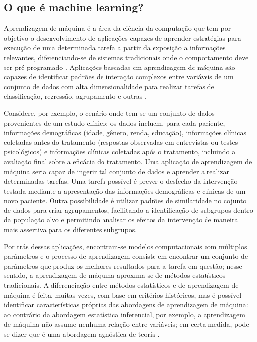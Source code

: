 \subsection{O que é machine learning?}

Aprendizagem de máquina é a área da ciência da computação que tem por objetivo o desenvolvimento
de aplicações capazes de aprender estratégias para execução de uma determinada tarefa a partir da
exposição a informações relevantes, diferenciando-se de sistemas tradicionais onde o comportamento
deve ser pré-programado \cite{Bi2019}. Aplicações baseadas em aprendizagem de máquina são capazes de
identificar padrões de interação complexos entre variáveis de um conjunto de dados com alta dimensionalidade
para realizar tarefas de classificação, regressão, agrupamento e outras \cite{Delgadillo2020}.

Considere, por exemplo, o cenário onde tem-se um conjunto de dados provenientes de um estudo clínico; os dados
incluem, para cada paciente, informações demográficas (idade, gênero, renda, educação), informações clínicas
coletadas antes do tratamento (respostas observadas em entrevistas ou testes psicológicos) e informações clínicas
coletadas após o tratamento, incluindo a avaliação final sobre a eficácia do tratamento. Uma aplicação de aprendizagem de
máquina seria capaz de ingerir tal conjunto de dados e aprender a realizar determinadas tarefas. Uma tarefa possível
é prever o desfecho da intervenção testada mediante a apresentação das informações demográficas e clínicas de um
novo paciente. Outra possibilidade é utilizar padrões de similaridade no cojunto de dados para criar agrupamentos,
facilitando a identificação de subgrupos dentro da população alvo e permitindo analisar os efeitos da intervenção
de maneira mais assertiva para os diferentes subgrupos.

Por trás dessas aplicações, encontram-se modelos computacionais com múltiplos parâmetros e o processo de
aprendizagem consiste em encontrar um conjunto de parâmetros que produz os melhores resultados para a tarefa
em questão; nesse sentido, a aprendizagem de máquina aproxima-se de métodos estatísticos tradicionais. A diferenciação
entre métodos estatísticos e de aprendizagem de máquina é feita, muitas vezes, com base em critérios históricos,
mas é possível identificar características próprias das abordagens de aprendizagem de máquina: ao contrário da abordagem
estatística inferencial, por exemplo, a aprendizagem de máquina não assume nenhuma relação entre variáveis; em certa medida,
pode-se dizer que é uma abordagem agnóstica de teoria \cite{Bi2019, Delgadillo2020}.

